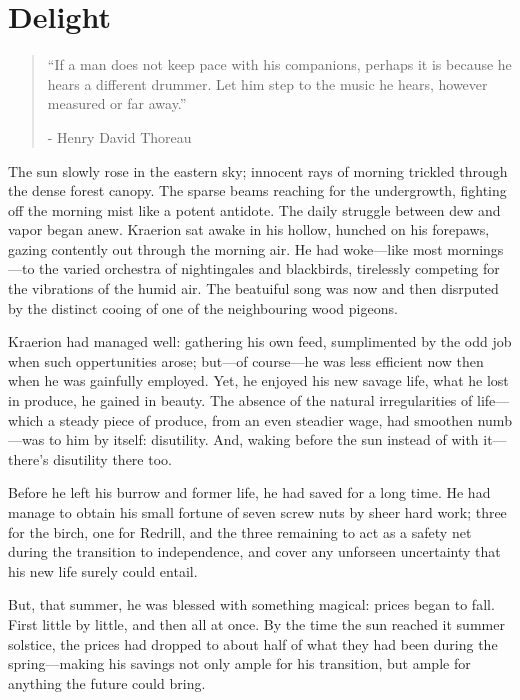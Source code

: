 \chapter{Delight}

\vspace{-1.3cm}
\begin{localsize}{10}
	\begin{quote}
		“If a man does not keep pace with his companions, perhaps it is because he hears a different drummer. Let him step to the music he hears, however measured or far away.”
		\begin{flushright}- Henry David Thoreau \end{flushright}
	\end{quote} 
\end{localsize}
\vspace{1cm}

The sun slowly rose in the eastern sky; innocent rays of morning trickled through the dense forest canopy. The sparse beams reaching for the undergrowth, fighting off the morning mist like a potent antidote. The daily struggle between dew and vapor began anew. Kraerion sat awake in his hollow, hunched on his forepaws, gazing contently out through the morning air. He had woke---like most mornings---to the varied orchestra of nightingales and blackbirds, tirelessly competing for the vibrations of the humid air. The beatuiful song was now and then disrputed by the distinct cooing of one of the neighbouring wood pigeons.

Kraerion had managed well: gathering his own feed, sumplimented by the odd job when such oppertunities arose; but---of course---he was less efficient now then when he was gainfully employed. Yet, he enjoyed his new savage life, what he lost in produce, he gained in beauty. The absence of the natural irregularities of life---which a steady piece of produce, from an even steadier wage, had smoothen numb---was to him by itself: disutility. And, waking before the sun instead of with it---there's disutility there too.

Before he left his burrow and former life, he had saved for a long time. He had manage to obtain his small fortune of seven screw nuts by sheer hard work; three for the birch, one for Redrill, and the three remaining to act as a safety net during the transition to independence, and cover any unforseen  uncertainty that his new life surely could entail.

But, that summer, he was blessed with something magical: prices began to fall. First little by little, and then all at once. By the time the sun reached it summer solstice, the prices had dropped to about half of what they had been during the spring---making his savings not only ample for his transition, but ample for anything the future could bring.

